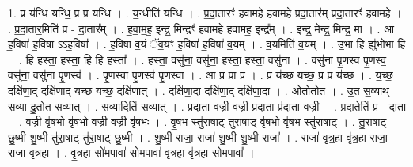 \documentclass[17pt]{extarticle}
\begin{document}
1. प्र य॑न्धि यन्धि॒ प्र प्र य॑न्धि । . य॒न्धीति॑ यन्धि । . प्र॒दा॒तारꣳ॑ हवामहे हवामहे प्रदा॒तार॑म् प्रदा॒तारꣳ॑ हवामहे । . प्र॒दा॒तार॒मिति॑ प्र - दा॒तार᳚म् । . ह॒वा॒म॒ह॒ इन्द्र॒ मिन्द्रꣳ॑ हवामहे हवामह॒ इन्द्र᳚म् । . इन्द्र॒ मेन्द्र॒ मिन्द्र॒ मा । . आ ह॒विषा॑ ह॒विषा ऽऽह॒विषा᳚ । . ह॒विषा॑ व॒यं ॅव॒यꣳ ह॒विषा॑ ह॒विषा॑ व॒यम् । . व॒यमिति॑ व॒यम् । . उ॒भा हि ह्यु॑भोभा हि । . हि हस्ता॒ हस्ता॒ हि हि हस्ता᳚ । . हस्ता॒ वसु॑ना॒ वसु॑ना॒ हस्ता॒ हस्ता॒ वसु॑ना । . वसु॑ना पृ॒णस्व॑ पृ॒णस्व॒ वसु॑ना॒ वसु॑ना पृ॒णस्व॑ । . पृ॒णस्वा पृ॒णस्व॑ पृ॒णस्वा । . आ प्र प्रा प्र । . प्र य॑च्छ यच्छ॒ प्र प्र य॑च्छ । . य॒च्छ॒ दक्षि॑णा॒द् दक्षि॑णाद् यच्छ यच्छ॒ दक्षि॑णात् । . दक्षि॑णा॒दा दक्षि॑णा॒द् दक्षि॑णा॒दा । . ओतोतोत । . उ॒त स॒व्याथ् स॒व्या दु॒तोत स॒व्यात् । . स॒व्यादिति॑ स॒व्यात् । . प्र॒दा॒ता व॒ज्री व॒ज्री प्र॑दा॒ता प्र॑दा॒ता व॒ज्री । . प्र॒दा॒तेति॑ प्र - दा॒ता । . व॒ज्री वृ॑ष॒भो वृ॑ष॒भो व॒ज्री व॒ज्री वृ॑ष॒भः । . वृ॒ष॒भ स्तु॑रा॒षाट् तु॑रा॒षाड् वृ॑ष॒भो वृ॑ष॒भ स्तु॑रा॒षाट् । . तु॒रा॒षाट् छु॒ष्मी शु॒ष्मी तु॑रा॒षाट् तु॑रा॒षाट् छु॒ष्मी । . शु॒ष्मी राजा॒ राजा॑ शु॒ष्मी शु॒ष्मी राजा᳚ । . राजा॑ वृत्र॒हा वृ॑त्र॒हा राजा॒ राजा॑ वृत्र॒हा । . वृ॒त्र॒हा सो॑म॒पावा॑ सोम॒पावा॑ वृत्र॒हा वृ॑त्र॒हा सो॑म॒पावा᳚ । \newline
\end{document}
